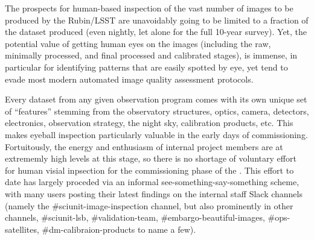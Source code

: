 The prospects for human-based inspection of the vast number of images to be
produced by the Rubin/LSST are unavoidably going to be limited to a 
fraction of the dataset produced (even nightly, let alone for the full 10-year
survey).  Yet, the potential value of getting human eyes on the images (including
the raw, minimally processed, and final processed and calibrated stages), is
immense, in particular for identifying patterns that are easily spotted by eye,
yet tend to evade most modern automated image quality assessment protocols.

Every dataset from any given observation program comes with its own unique set
of ``features'' stemming from the observatory structures, optics, camera,
detectors, electronics, observation strategy, the night sky, calibration products, 
etc.  This makes eyeball inspection particularly valuable in the early days of 
commissioning.  Fortuitously, the energy and enthusiasm of internal project members
are at extrememly high levels at this stage, so there is no shortage of voluntary
effort for human visial inpsection for the commissioning phase of the \ComCam.
This effort to date has largely proceded via an informal
see-something-say-something scheme, with many users posting their latest findings
on the internal staff Slack channels (namely the \#sciunit-image-inspection channel,
but also prominently in other channels, \#sciunit-lsb, \#validation-team,
\#embargo-beautiful-images, \#ops-satellites, \#dm-calibraion-products to name a few).

